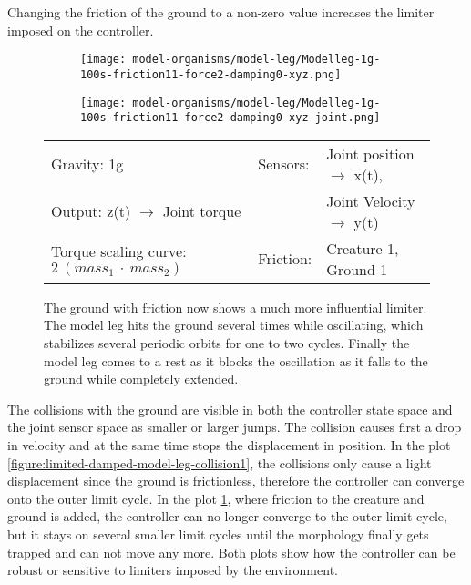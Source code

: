 \documentclass[main]{subfiles}
\begin{document}
Changing the friction of the ground to a non-zero value increases the limiter imposed on the controller.

\begin{figure}[H]
	\centering
		\begin{subfigure}[c]{0.45\textwidth}
	\texttt{[image: model-organisms/model-leg/Modelleg-1g-100s-friction11-force2-damping0-xyz.png]}
		\end{subfigure}
	\begin{subfigure}[c]{0.45\textwidth}
	\texttt{[image: model-organisms/model-leg/Modelleg-1g-100s-friction11-force2-damping0-xyz-joint.png]}
		\end{subfigure}
	\caption[Limited chaotic controller controlling model leg on ground with friction]{The ground with friction now shows a much more influential limiter. The model leg hits the ground several times while oscillating, which stabilizes several periodic orbits for one to two cycles. Finally the model leg comes to a rest as it blocks the oscillation as it falls to the ground while completely extended.}
	\begin{tabular}{l|ll}
	\hline 
	Gravity: 1g  & Sensors: & Joint position \(\rightarrow\) x(t),\\
	 Output: z(t) \(\rightarrow\) Joint torque &  & Joint Velocity \(\rightarrow\) y(t) \\
	  Torque scaling curve: \(2~(mass_1~\cdot~mass_2)\) & Friction: & Creature 1, Ground 1 \\
	  \hline
	\end{tabular}

	\label{figure:limited-damped-model-leg-collision2}
\end{figure}

The collisions with the ground are visible in both the controller state space and the joint sensor space as smaller or larger jumps. %
%
The collision causes first a drop in velocity and at the same time stops the displacement in position. %
%
In the plot \ref{figure:limited-damped-model-leg-collision1}, the collisions only cause a light displacement since the ground is frictionless, therefore the controller can converge onto the outer limit cycle. %
%
In the plot \ref{figure:limited-damped-model-leg-collision2}, where  friction to the creature and ground is added, the controller can no longer converge to the outer limit cycle, but it stays on several smaller limit cycles until the morphology finally gets trapped and can not move any more. %
%
Both plots show how the controller can be robust or sensitive to limiters imposed by the environment.
\end{document}
